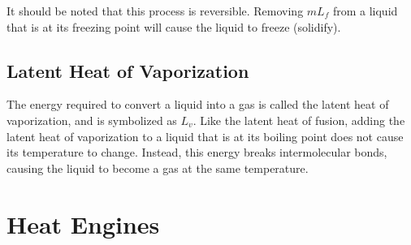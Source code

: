 	It should be noted that this process is reversible.  Removing $mL_f$ from a liquid that is at its freezing point will cause the liquid to freeze (solidify).  
	
	
	\subsection{Latent Heat of Vaporization}
	The energy required to convert a liquid into a gas is called the latent heat of vaporization, and is symbolized as $L_v$.  Like the latent heat of fusion, adding the latent heat of vaporization to a liquid that is at its boiling point does not cause its temperature to change. Instead, this energy breaks intermolecular bonds, causing the liquid to become a gas at the same temperature.   
	
	\section{Heat Engines}
	



